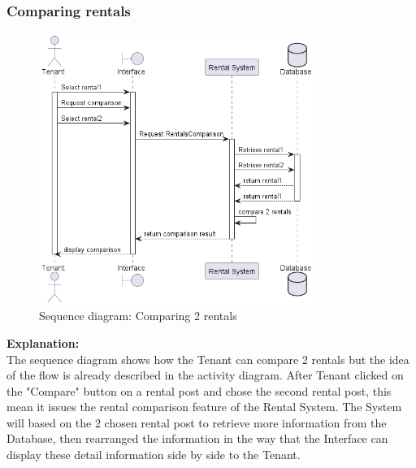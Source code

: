 \subsubsection{Comparing rentals}
\begin{figure}[H]
    \centering
    \includegraphics[width=0.8\textwidth]{Images/Sequence/compare_rental.png}
    \caption{Sequence diagram: Comparing 2 rentals}
    \label{fig:seq-diag-compare}
\end{figure}
\noindent \textbf{Explanation:}\\
The sequence diagram shows how the Tenant can compare 2 rentals but the idea of the flow is already described in the activity diagram. After Tenant clicked on the "Compare" button on a rental post and chose the second rental post, this mean it issues the rental comparison feature of the Rental System. The System will based on the 2 chosen rental post to retrieve more information from the Database, then rearranged the information in the way that the Interface can display these detail information side by side to the Tenant. 


\newpage
